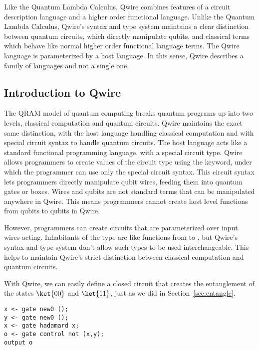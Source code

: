 Like the Quantum Lambda Calculus, Qwire combines features of a circuit description language and a higher order functional language.
Unlike the Quantum Lambda Calculus, Qwire's syntax and type system maintains a clear distinction between quantum circuits, which directly manipulate qubits, and classical terms which behave like normal higher order functional language terms.
The Qwire language is parameterized by a host language.
In this sense, Qwire describes a family of languages and not a single one.

\subsection{Introduction to Qwire}


The QRAM model of quantum computing breaks quantum programs up into two levels, classical computation and quantum circuits.
Qwire maintains the exact same distinction, with the host language handling classical computation and with special circuit syntax to handle quantum circuits.
The host language acts like a standard functional programming language, with a special circuit type.
Qwire allows programmers to create values of the circuit type using the  keyword, under which the programmer can use only the special circuit syntax.
This circuit syntax lets programmers directly manipulate qubit wires, feeding them into quantum gates or boxes.
Wires and qubits are not standard terms that can be manipulated anywhere in Qwire.
This means programmers cannot create host level functions from qubits to qubits in Qwire.

However, programmers can create circuits that are parameterized over input wires acting.
Inhabitants of the type  are like functions from  to , but Qwire's syntax and type system don't allow such types to be used interchangeable.
This helps to maintain Qwire's strict distinction between classical computation and quantum circuits.

With Qwire, we can easily define a closed circuit that creates the entanglement of the states $\ket{00}$ and $\ket{11}$, just as we did in Section~\ref{sec:entangle}.

\begin{lstlisting}[style=customcoq]
x <- gate new0 ();
y <- gate new0 ();
x <- gate hadamard x;
o <- gate control not (x,y);
output o
\end{lstlisting}

\\


